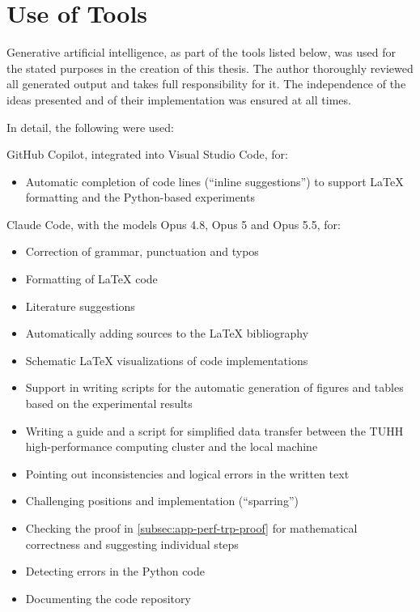 \documentclass[12pt,final,twoside]{report}
\theoremstyle{plain}
\theoremstyle{definition}
\theoremstyle{remark}
\begin{document}
    
\cleardoublepage


\vspace{2cm}
\chapter*{Use of Tools}
\label{sec:tool-usage-en}
Generative artificial intelligence, as part of the tools listed below, was used for the stated
purposes in the creation of this thesis. The author thoroughly reviewed all generated output and
takes full responsibility for it. The independence of the ideas presented and of their implementation
was ensured at all times.

In detail, the following were used:

GitHub Copilot, integrated into Visual Studio Code, for:
\begin{itemize}
  \item Automatic completion of code lines (``inline suggestions'') to support
  \LaTeX{} formatting and the Python-based experiments
\end{itemize}

Claude Code, with the models Opus 4.8, Opus 5 and Opus 5.5, for:
\begin{itemize}
  \item Correction of grammar, punctuation and typos
  \item Formatting of \LaTeX{} code
  \item Literature suggestions
  \item Automatically adding sources to the \LaTeX{} bibliography
  \item Schematic \LaTeX{} visualizations of code implementations
  \item Support in writing scripts for the automatic generation of figures and tables based
  on the experimental results
  \item Writing a guide and a script for simplified data transfer between the TUHH high-performance computing cluster and
  the local machine
  \item Pointing out inconsistencies and logical errors in the written text
  \item Challenging positions and implementation (``sparring'')
  \item Checking the proof in \cref{subsec:app-perf-trp-proof} for mathematical correctness and suggesting individual steps
  \item Detecting errors in the Python code
  \item Documenting the code repository
\end{itemize}
\end{document}
